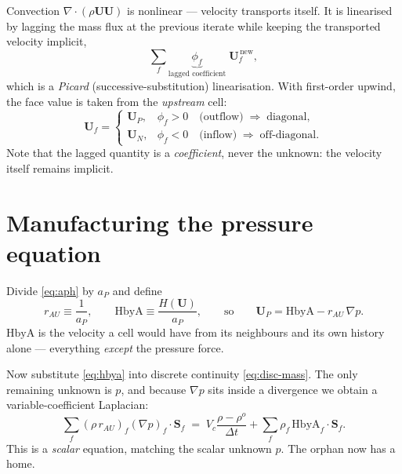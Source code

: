 \documentclass[11pt,a4paper]{article}
\newcommand{\Sf}{\mathbf{S}_f}
\newcommand{\uvec}{\mathbf{U}}
\newcommand{\dt}{\Delta t}
\begin{document}
Convection $\nabla\!\cdot\!(\rho\uvec\uvec)$ is nonlinear --- velocity
transports itself. It is linearised by lagging the mass flux at the previous
iterate while keeping the transported velocity implicit,
\begin{equation}
  \sum_f \underbrace{\phi_f}_{\text{lagged coefficient}} \; \uvec_f^{\,\text{new}},
\end{equation}
which is a \emph{Picard} (successive-substitution) linearisation. With
first-order upwind, the face value is taken from the \emph{upstream} cell:
\begin{equation}
  \uvec_f =
  \begin{cases}
    \uvec_P, & \phi_f > 0 \quad\text{(outflow)} \;\Rightarrow\; \text{diagonal},\\
    \uvec_N, & \phi_f < 0 \quad\text{(inflow)} \;\Rightarrow\; \text{off-diagonal}.
  \end{cases}
\end{equation}
Note that the lagged quantity is a \emph{coefficient}, never the unknown: the
velocity itself remains implicit.

\section{Manufacturing the pressure equation}\label{sec:pressure}

Divide \eqref{eq:aph} by $a_P$ and define
\begin{equation}
  r_{AU} \equiv \frac{1}{a_P},
  \qquad
  \mathrm{HbyA} \equiv \frac{H(\uvec)}{a_P},
  \qquad\text{so}\qquad
  \uvec_P = \mathrm{HbyA} - r_{AU}\,\nabla p .
  \label{eq:hbya}
\end{equation}
$\mathrm{HbyA}$ is the velocity a cell would have from its neighbours and its
own history alone --- everything \emph{except} the pressure force.

Now substitute \eqref{eq:hbya} into discrete continuity \eqref{eq:disc-mass}.
The only remaining unknown is $p$, and because $\nabla p$ sits inside a
divergence we obtain a variable-coefficient Laplacian:
\begin{equation}
  \sum_f (\rho\, r_{AU})_f (\nabla p)_f \cdot \Sf
  \;=\;
  V_c \frac{\rho - \rho^o}{\dt} + \sum_f \rho_f\, \mathrm{HbyA}_f\!\cdot\!\Sf .
  \label{eq:peqn-generic}
\end{equation}
This is a \emph{scalar} equation, matching the scalar unknown $p$. The orphan
now has a home.
\end{document}
